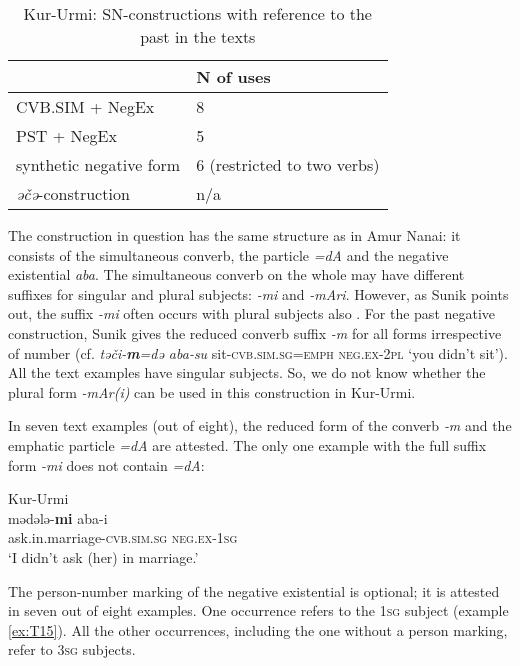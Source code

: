 \documentclass[output=paper]{langscibook}
\begin{document}
\begin{table}[!h]
    \caption{Kur-Urmi: SN-constructions with reference to the past in the texts \citep{sunik1958a}}
    \label{tab:T4}
    \begin{tabular}{@{}ll@{}}
    \toprule
     & N of uses \\ \midrule
    CVB.SIM + NegEx & 8 \\
    PST + NegEx & 5 \\
    synthetic negative form & 6 (restricted to two verbs) \\
    \textit{əčə}-construction & n/a \\ \bottomrule
    \end{tabular}
    \end{table}

The construction in question has the same structure as in Amur Nanai: it consists of the simultaneous converb, the particle \textit{=dA} and the negative existential \textit{aba}. The simultaneous converb on the whole may have different suffixes for singular and plural subjects: \textit{-mi} and \textit{-mAri}. However, as Sunik points out, the suffix \textit{-mi} often occurs with plural subjects also \citep[95]{sunik1958a}. For the past negative construction, Sunik gives the reduced converb suffix \textit{-m} for all forms irrespective of number (cf. \textit{təči-\textbf{m}=də aba-su} sit-\textsc{cvb.sim.sg=emph} \textsc{neg.ex-2pl} `you didn’t sit'). All the text examples have singular subjects. So, we do not know whether the plural form \textit{-mAr(i)} can be used in this construction in Kur-Urmi.

In seven text examples (out of eight), the reduced form of the converb \textit{‑m} and the emphatic particle \textit{=dA} are attested. The only one example with the full suffix form \textit{-mi} does not contain \textit{=dA}:

\ea Kur-Urmi \label{ex:T15}\\
	\gll mədələ-\textbf{mi}	aba-i\\
	ask.in.marriage-\textsc{cvb.sim.sg}	\textsc{neg.ex-1sg}\\
	\glt `I didn’t ask (her) in marriage.' \citep[127, text]{sunik1958a}
\z

The person-number marking of the negative existential is optional; it is attested in seven out of eight examples. One occurrence refers to the \textsc{1sg} subject (example \ref{ex:T15}). All the other occurrences, including the one without a person marking, refer to \textsc{3sg} subjects.
\end{document}
